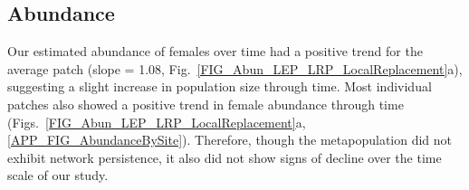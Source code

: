 \documentclass[12pt, oneside]{article}   	%
\begin{document}

\subsection*{Abundance}

Our estimated abundance of females over time had a positive trend for the average patch (slope = 1.08, Fig.\ \ref{FIG_Abun_LEP_LRP_LocalReplacement}a), suggesting a slight increase in population size through time. Most individual patches also showed a positive trend in female abundance through time (Figs.\ \ref{FIG_Abun_LEP_LRP_LocalReplacement}a, \ref{APP_FIG_AbundanceBySite}). Therefore, though the metapopulation did not exhibit network persistence, it also did not show signs of decline over the time scale of our study. 


\end{document}
